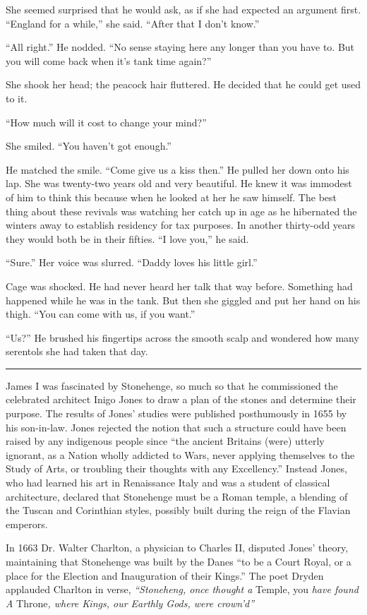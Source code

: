 She seemed surprised that he would ask, as if she had expected an argument first. ``England for a while,'' she said. ``After that I don't know.''

``All right.'' He nodded. ``No sense staying here any longer than you have to. But you will come back when it's tank time again?''

She shook her head; the peacock hair fluttered. He decided that he could get used to it.

``How much will it cost to change your mind?''

She smiled. ``You haven't got enough.''

He matched the smile. ``Come give us a kiss then.'' He pulled her down onto his lap. She was twenty-two years old and very beautiful. He knew it was immodest of him to think this because when he looked at her he saw himself. The best thing about these revivals was watching her catch up in age as he hibernated the winters away to establish residency for tax purposes. In another thirty-odd years they would both be in their fifties. ``I love you,'' he said.

``Sure.'' Her voice was slurred. ``Daddy loves his little girl.''

Cage was shocked. He had never heard her talk that way before. Something had happened while he was in the tank. But then she giggled and put her hand on his thigh. ``You can come with us, if you want.''

``Us?'' He brushed his fingertips across the smooth scalp and wondered how many serentols she had taken that day.

\fancybreak{* * *}

James I was fascinated by Stonehenge, so much so that he commissioned the celebrated architect Inigo Jones to draw a plan of the stones and determine their purpose. The results of Jones' studies were published posthumously in 1655 by his son-in-law. Jones rejected the notion that such a structure could have been raised by any indigenous people since ``the ancient Britains (were) utterly ignorant, as a Nation wholly addicted to Wars, never applying themselves to the Study of Arts, or troubling their thoughts with any Excellency.'' Instead Jones, who had learned his art in Renaissance Italy and was a student of classical architecture, declared that Stonehenge must be a Roman temple, a blending of the Tuscan and Corinthian styles, possibly built during the reign of the Flavian emperors.

In 1663 Dr. Walter Charlton, a physician to Charles II, disputed Jones' theory, maintaining that Stonehenge was built by the Danes ``to be a Court Royal, or a place for the Election and Inauguration of their Kings.'' The poet Dryden applauded Charlton in verse, \textit{``Stoneheng, once thought a} Temple, you \textit{have found A} Throne\textit{, where Kings, our Earthly Gods, were crown'd''}

